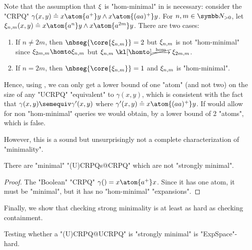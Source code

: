 \begin{remark}
	\AP\label{rk:structure-theorem}
	Note that the assumption that $\xi$ is "hom-minimal" in
	 is necessary: consider the "CRPQ"
	$\gamma(x,y) \defeq x \atom{a^+} y \land x \atom{(aa)^+} y$.
	For $n,m \in \Np$, let $\anexpansion_{n,m}(x,y) \defeq x \atom{a^n} y \land x \atom{a^{2m}} y$.
	There are two cases:
	\begin{enumerate}
		\item \AP\label{rk:structure-theorem:1} If $n \neq 2m$, then $\nbseg{\core{\anexpansion_{n,m}}} = 2$
			but $\xi_{n,m}$ is not "hom-minimal" since $\anexpansion_{2m,m} \homto \anexpansion_{n,m}$ but $\anexpansion_{n,m} \nothomto \anexpansion_{2m,m}$.
		\item If $n = 2m$, then $\nbseg{\core{\anexpansion_{n,m}}} = 1$
		and $\xi_{n,m}$ is "hom-minimal".
	\end{enumerate}
	Hence, using , we can only get a lower bound of
	one "atom" (and not two) on the size of any "UCRPQ" "equivalent" to $\gamma(x,y)$,
	which is consistent with the fact that $\gamma(x,y) \semequiv \gamma'(x,y)$
	where $\gamma'(x,y) \defeq x \atom{(aa)^+} y$.
	If  would allow for non "hom-minimal" queries we would obtain, by  a lower bound of 2 "atoms", which is false.
\end{remark}

However, this is a sound but unsurprisingly not a complete characterization of "minimality".

\begin{proposition}
	There are "minimal" "(U)CRPQs@CRPQ" which are not "strongly minimal". 
\end{proposition}

\begin{proof}
	The "Boolean" "CRPQ" $\gamma() = x \atom{a^+} x$. Since it has one atom, it must be "minimal", but it has no "hom-minimal" "expansions".
\end{proof}

Finally, we show that checking strong minimality is at least as hard as checking containment.

\begin{proposition}
	\AP\label{prop:lowerbound-strong-minimality}
	Testing whether a "(U)CRPQ@UCRPQ" is "strongly minimal" is "ExpSpace"-hard.
\end{proposition}

